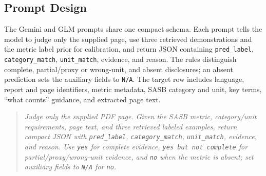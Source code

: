 \documentclass[sigconf,article]{acmart}
\begin{document}
\subsection{Prompt Design}
The Gemini and GLM prompts share one compact schema. Each prompt tells the model to judge only the supplied page, use three retrieved demonstrations and the metric label prior for calibration, and return JSON containing \texttt{pred\_label}, \texttt{category\_match}, \texttt{unit\_match}, evidence, and reason. The rules distinguish complete, partial/proxy or wrong-unit, and absent disclosures; an absent prediction sets the auxiliary fields to \texttt{N/A}. The target row includes language, report and page identifiers, metric metadata, SASB category and unit, key terms, ``what counts'' guidance, and extracted page text.

\begin{quote}\small\itshape
Judge only the supplied PDF page. Given the SASB metric, category/unit requirements, page text, and three retrieved labeled examples, return compact JSON with \texttt{pred\_label}, \texttt{category\_match}, \texttt{unit\_match}, evidence, and reason. Use \texttt{yes} for complete evidence, \texttt{yes but not complete} for partial/proxy/wrong-unit evidence, and \texttt{no} when the metric is absent; set auxiliary fields to \texttt{N/A} for \texttt{no}.
\end{quote}
\end{document}
